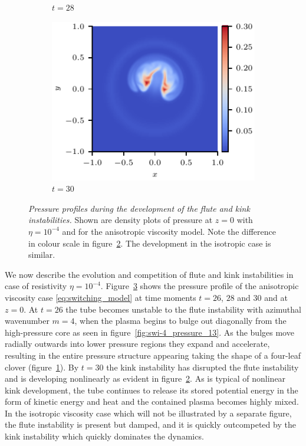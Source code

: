 \documentclass[fleqn,usenatbib]{mnras}
\newcommand{\mycaption}[2]{\caption[#1]{\emph{#1} #2}}
\begin{document}
\begin{figure}
\begin{subfigure}{0.32\textwidth}
      \caption{$t=28$}
      \label{fig:swi-4_pressure_14}
    \end{subfigure}
    \hfill
    \begin{subfigure}{0.32\textwidth}
      \includegraphics[width=\linewidth]{swi-4_pressure_15.pdf}
      \caption{$t=30$}
      \label{fig:swi-4_pressure_15}
    \end{subfigure}
\mycaption{Pressure profiles during the development of the flute and kink
instabilities.}{Shown are density plots of pressure at $z=0$ with $\eta
= 10^{-4}$ and for the anisotropic viscosity model. Note the difference in
colour scale in figure~\ref{fig:swi-4_pressure_15}. The development in the
isotropic case is similar.}
\label{fig:kink_pressure_slices-4}%
\end{figure}

We now describe the evolution and competition of flute and kink instabilities
in case of resistivity $\eta=10^{-4}$. Figure~\ref{fig:kink_pressure_slices-4}
shows the pressure profile of the anisotropic viscosity case
\eqref{eq:switching_model} at time moments $t=26$, $28$ and $30$ and at $z=0$.
At $t=26$ the tube becomes unstable to the flute instability with azimuthal
wavenumber $m=4$, when the plasma begins to  bulge out diagonally from the
high-pressure core as seen in figure~\ref{fig:swi-4_pressure_13}. As  the
bulges move radially outwards into lower pressure regions they expand and
accelerate, resulting in the entire pressure structure appearing taking the
shape of a four-leaf clover (figure~\ref{fig:swi-4_pressure_14}). By $t=30$ the
kink instability has disrupted the flute instability and is developing
nonlinearly as evident in figure~\ref{fig:swi-4_pressure_15}. As is typical of
nonlinear kink development, the tube continues to release its stored potential
energy in the form of kinetic energy and heat and the contained plasma becomes
highly mixed. In the  isotropic viscosity case which will not be illustrated by
a separate figure, the flute instability is present but damped, and it is
quickly outcompeted by the kink instability which quickly dominates the
dynamics. 
\end{document}
